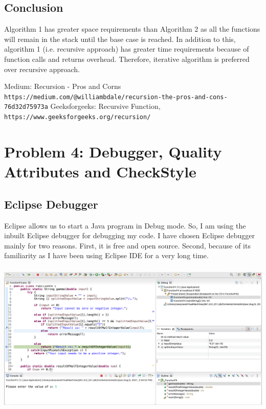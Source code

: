 \documentclass[a4paper,12pt]{article}
\begin{document}
    \subsection{Conclusion}
    Algorithm 1 has greater space requirements than Algorithm 2 as all the functions will remain in the stack until the base case is reached. In addition to this, algorithm 1 (i.e. recursive approach) has greater time requirements because of function calls and returns overhead. Therefore, iterative algorithm is preferred over recursive approach.

    \begin{thebibliography}{}
    \bibitem{}
    Medium: Recursion - Pros and Corns
    \\\texttt{https://medium.com/@williambdale/recursion-the-pros-and-cons-76d32d75973a}
    \bibitem{}
    Geeksforgeeks: Recursive Function,
    \\\texttt{https://www.geeksforgeeks.org/recursion/}
    \end{thebibliography}
    
    \newpage
    \section{Problem 4: Debugger, Quality Attributes and CheckStyle}
    \subsection{Eclipse Debugger}
    Eclipse allows us to start a Java program in Debug mode. So, I am using the inbuilt Eclipse debugger for debugging my code. I have chosen Eclipse debugger mainly for two reasons. First, it is free and open source. Second, because of its familiarity as I have been using Eclipse IDE for a very long time.\\ \\
    \includegraphics[width=16cm, height=7cm]{debugger.png}
\end{document}
